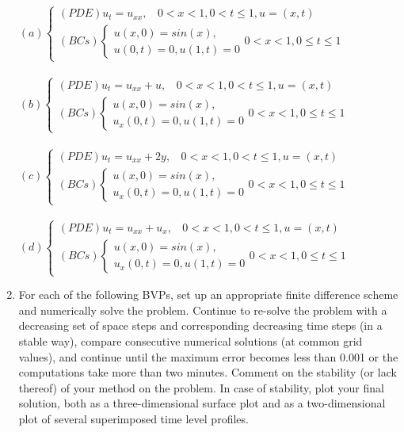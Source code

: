 \documentclass[../main.tex]{subfiles}
\begin{document}
\begin{enumerate}
\\
\\
$(a)\begin{cases} 
	(PDE) u_t= u_{xx},
	~~~~0<x<1, 0<t\leqslant 1,u=(x,t)\\
(BCs)
		\begin{cases}
		u(x,0)=sin(x),\\
		u(0,t)=0, u(1,t)=0
		\end{cases}
		0 < x < 1, 0 \leqslant t \leqslant 1 
	\end{cases}$
\\
\\
$(b)\begin{cases} 
	(PDE) u_t= u_{xx}+u,
	~~~~0<x<1, 0<t\leqslant 1,u=(x,t)\\
(BCs)
		\begin{cases}
		u(x,0)=sin(x),\\
		u_x(0,t)=0, u(1,t)=0
		\end{cases}
		0 < x < 1, 0 \leqslant t \leqslant 1 
	\end{cases}$
\\
\\
$(c)\begin{cases} 
	(PDE) u_t= u_{xx}+2y,
	~~~~0<x<1, 0<t\leqslant 1,u=(x,t)\\
(BCs)
		\begin{cases}
		u(x,0)=sin(x),\\
		u_x(0,t)=0, u(1,t)=0
		\end{cases}
		0 < x < 1, 0 \leqslant t \leqslant 1 
	\end{cases}$
\\
\\
$(d)\begin{cases} 
	(PDE) u_t= u_{xx}+u_x,
	~~~~0<x<1, 0<t\leqslant 1,u=(x,t)\\
(BCs)
		\begin{cases}
		u(x,0)=sin(x),\\
		u_x(0,t)=0, u(1,t)=0
		\end{cases}
		0 < x < 1, 0 \leqslant t \leqslant 1 
	\end{cases}$
		\item
			For each of the following BVPs, set up an appropriate finite difference scheme and numerically solve the problem. Continue to re-solve the problem with a decreasing set of space steps and corresponding decreasing time steps (in a stable way), compare consecutive numerical solutions (at common grid values), and continue until the maximum error becomes less than 0.001 or the computations take more than two minutes. Comment on the stability (or lack thereof) of your method on the problem. In case of stability, plot your final solution, both as a three-dimensional surface plot and as a two-dimensional plot of several superimposed time level profiles. 

\end{enumerate}
\end{document}
